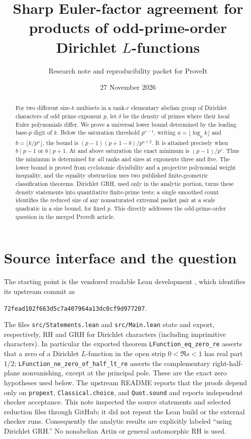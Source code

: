 \documentclass[11pt]{article}
\title{\bfseries Sharp Euler-factor agreement for\\ products of odd-prime-order Dirichlet \(L\)-functions}
\author{Research note and reproducibility packet for ProveIt}
\date{27 November 2026}
\theoremstyle{remark}\newtheorem{remark}[theorem]{Remark}
\begin{document}
\maketitle
\begin{abstract}
For two different size-$k$ multisets in a rank-$r$ elementary abelian group of Dirichlet characters of odd prime exponent $p$, let $\delta$ be the density of primes where their local Euler polynomials differ. We prove a universal lower bound determined by the leading base-$p$ digit of $k$. Below the saturation threshold $p^{r-1}$, writing $a=\lfloor\log_p k\rfloor$ and $b=\lfloor k/p^a\rfloor$, the bound is $(p-1)(p+1-b)/p^{a+2}$. It is attained precisely when $b\mid p-1$ or $b\mid p+1$. At and above saturation the exact minimum is $(p-1)/p^r$. Thus the minimum is determined for \emph{all} ranks and sizes at exponents three and five. The lower bound is proved from cyclotomic divisibility and a projective polynomial weight inequality, and the equality obstruction uses two published finite-geometric classification theorems. Dirichlet GRH, used only in the analytic portion, turns these density statements into quantitative finite-prime tests; a single smoothed count identifies the reduced size of any nonsaturated extremal packet pair at a scale quadratic in a size bound, for fixed $p$. This directly addresses the odd-prime-order question in the merged ProveIt article.
\end{abstract}

\section{Source interface and the question}
The starting point is the vendored readable Lean development \cite{vendor,lean}, which identifies its upstream commit as
\begin{center}\small\texttt{72fead102f663d5c7a407964a13dc0cf9d977207}.\end{center}
The files \texttt{src/Statements.lean} and \texttt{src/Main.lean} state and export, respectively, RH and GRH for Dirichlet characters (including imprimitive characters). In particular the exported theorem \texttt{LFunction\_eq\_zero\_re} asserts that a zero of a Dirichlet $L$-function in the open strip $0<\Re s<1$ has real part $1/2$; \texttt{LFunction\_ne\_zero\_of\_half\_lt\_re} asserts the complementary right-half-plane nonvanishing, except at the principal pole. These are the exact zero hypotheses used below. The upstream README reports that the proofs depend only on \texttt{propext}, \texttt{Classical.choice}, and \texttt{Quot.sound} and reports independent checker acceptance. This note inspected the source statements and selected reduction files through GitHub; it did not repeat the Lean build or the external checker runs. Consequently the analytic results are explicitly labeled ``using Dirichlet GRH.'' No nonabelian Artin or general automorphic RH is used.
\end{document}
